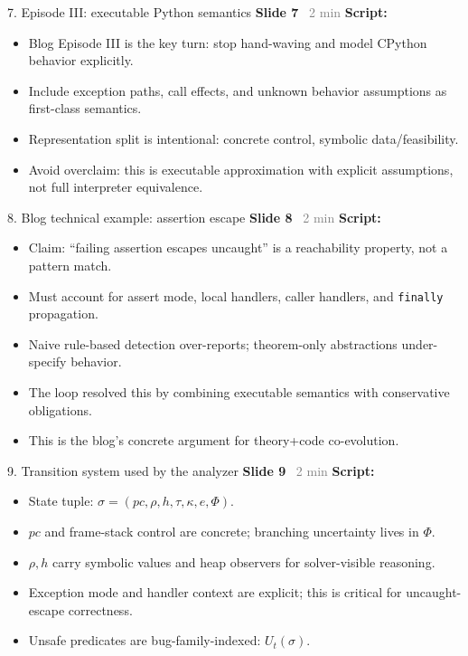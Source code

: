 \documentclass[aspectratio=169]{beamer}
\newcommand{\syncline}[2]{\textbf{#1} \hfill \textcolor{gray}{#2}}
\begin{document}
\begin{frame}{7. Episode III: executable Python semantics}
\syncline{Slide 7}{~2 min}
\textbf{Script:}
\begin{itemize}
  \item Blog Episode III is the key turn: stop hand-waving and model CPython behavior explicitly.
  \item Include exception paths, call effects, and unknown behavior assumptions as first-class semantics.
  \item Representation split is intentional: concrete control, symbolic data/feasibility.
  \item Avoid overclaim: this is executable approximation with explicit assumptions, not full interpreter equivalence.
\end{itemize}
\end{frame}

\begin{frame}{8. Blog technical example: assertion escape}
\syncline{Slide 8}{~2 min}
\textbf{Script:}
\begin{itemize}
  \item Claim: ``failing assertion escapes uncaught'' is a reachability property, not a pattern match.
  \item Must account for assert mode, local handlers, caller handlers, and \texttt{finally} propagation.
  \item Naive rule-based detection over-reports; theorem-only abstractions under-specify behavior.
  \item The loop resolved this by combining executable semantics with conservative obligations.
  \item This is the blog's concrete argument for theory+code co-evolution.
\end{itemize}
\end{frame}

\begin{frame}{9. Transition system used by the analyzer}
\syncline{Slide 9}{~2 min}
\textbf{Script:}
\begin{itemize}
  \item State tuple: \(\sigma=(pc,\rho,h,\tau,\kappa,e,\Phi)\).
  \item \(pc\) and frame-stack control are concrete; branching uncertainty lives in \(\Phi\).
  \item \(\rho,h\) carry symbolic values and heap observers for solver-visible reasoning.
  \item Exception mode and handler context are explicit; this is critical for uncaught-escape correctness.
  \item Unsafe predicates are bug-family-indexed: \(U_t(\sigma)\).
\end{itemize}
\end{frame}
\end{document}
